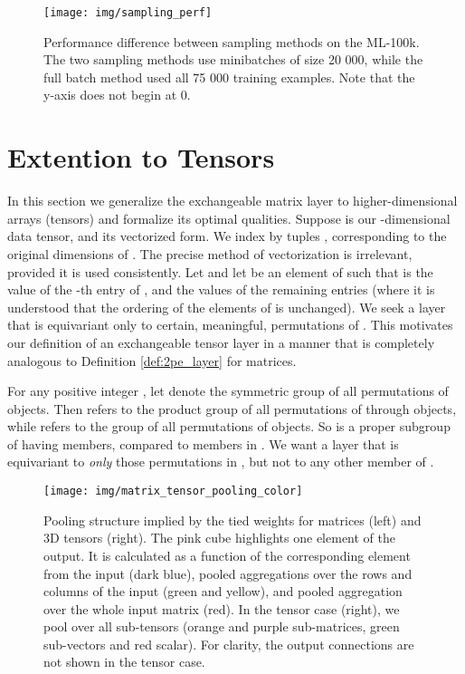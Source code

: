 \documentclass{article}
\theoremstyle{definition}
\begin{document}
\begin{figure}[h]\centering
\texttt{[image: img/sampling\_perf]}
\caption{Performance difference between sampling methods on the ML-100k. The two sampling methods use minibatches of size 20 000, while the full batch method used all 75 000 training examples. Note that the y-axis does not begin at 0.}
\label{fig:sampling_perf}
\end{figure}

\section{Extention to Tensors}\label{sec:tensors}
In this section we generalize the exchangeable matrix layer to higher-dimensional arrays (tensors) and formalize its optimal qualities.
Suppose  is our -dimensional data tensor, and  its vectorized form. We index  by tuples , corresponding to the original dimensions of . The precise method of vectorization is irrelevant, provided it is used consistently. Let  and let  be an element of  such that  is the value of the -th entry of , and  the values of the remaining entries (where it is understood that the ordering of the elements of  is unchanged). We seek a layer that is equivariant only to certain, meaningful, permutations of . This motivates our definition of an exchangeable tensor layer in a manner that is completely analogous to Definition \ref{def:2pe_layer} for matrices. 

For any positive integer , let  denote the symmetric group of all permutations of  objects. Then  refers to the product group of all permutations of  through  objects, while  refers to the group of all permutations of  objects. So  is a proper subgroup of  having  members, compared to  members in . We want a layer that is equivariant to \textit{only} those permutations in , but not to any other member of .

\begin{figure}[t]\centering
\texttt{[image: img/matrix\_tensor\_pooling\_color]}
\caption{Pooling structure implied by the tied weights for matrices (left) and 3D tensors (right). The pink cube highlights one element of the output. It is calculated as a function of the corresponding element from the input (dark blue), pooled aggregations over the rows and columns of the input (green and yellow), and pooled aggregation over the whole input matrix (red). In the tensor case (right), we pool over all sub-tensors (orange and purple sub-matrices, green sub-vectors and red scalar). For clarity, the output connections are not shown in the tensor case.
}
\label{fig:exch_matrix_layer}
\end{figure}
\end{document}
